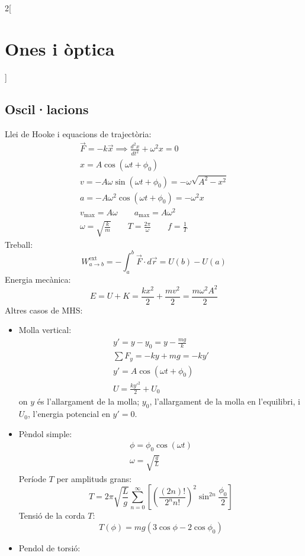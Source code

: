 \documentclass[../../../main.tex]{subfiles}
\begin{document}
\begin{multicols}{2}[\section{Ones i òptica}]
  \subsection{Oscil·lacions}
  Llei de Hooke i equacions de trajectòria:
  \begin{gather*}
    \Vec{F}=-k\Vec{x}\implies\frac{d^2x}{dt^2}+\omega^2x=0\\
    x=A\cos(\omega t+\phi_0)\\
    v=-A\omega\sin(\omega t+\phi_0)=-\omega\sqrt{A^2-x^2}\\
    a=-A\omega^2\cos(\omega t+\phi_0)=-\omega^2x\\
    v_\text{max}=A\omega\qquad a_\text{max}=A\omega^2\\
    \omega=\sqrt{\frac{k}{m}}\qquad T=\frac{2\pi}{\omega}\qquad f=\frac{1}{T}
  \end{gather*}
  Treball: $$W_{a\to b}^\text{ext}=-\int_a^b\Vec{F}\cdot d\Vec{r}=U(b)-U(a)$$
  Energia mecànica: $$E=U+K=\frac{kx^2}{2}+\frac{mv^2}{2}=\frac{m\omega^2A^2}{2}$$
  Altres casos de MHS:
  \begin{itemize}
    \item Molla vertical:
          \begin{gather*}
            y'=y-y_0=y-\frac{mg}{k}\\
            \sum F_y=-ky+mg=-ky'\\
            y'=A\cos(\omega t+\phi_0)\\
            U=\frac{ky'^2}{2}+U_0
          \end{gather*}
          {\footnotesize on $y$ és l'allargament de la molla; $y_0$, l'allargament de la molla en l'equilibri, i $U_0$, l'energia potencial en $y'=0$.}
    \item Pèndol simple:
          \begin{gather*}
            \phi=\phi_0\cos(\omega t)\\
            \omega=\sqrt{\frac{g}{L}}
          \end{gather*}
          Període $T$ per amplituds grans:
          $$T=2\pi\sqrt{\frac{L}{g}}\sum_{n=0}^\infty\left[\left(\frac{(2n)!}{2^nn!}\right)^2\sin^{2n}\frac{\phi_0}{2}\right]$$
          Tensió de la corda $T$: $$T(\phi)=mg(3\cos\phi-2\cos\phi_0)$$
    \item Pendol de torsió:

\end{itemize}
\end{multicols}
\end{document}
